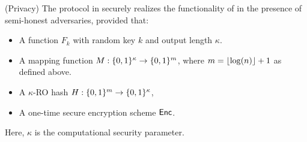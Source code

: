 \begin{theorem}(Privacy)
\label{thm:sotpriv}
The \SSOT protocol in  securely realizes the  functionality of  in the presence of semi-honest adversaries, provided that:
\begin{itemize}\addtolength{\itemsep}{-6pt}
	\item  A \batchOPRF function $F_k$ with random key $k$ and output length $\kappa$.
	\item A mapping function $M:\{0,1\}^\kappa \rightarrow \{0,1\}^m$, where $m={\lfloor{\log(n)}\rfloor}+1$ as defined above.
	\item A $\kappa$-RO hash  $H:\{0,1\}^m \rightarrow \{0,1\}^\kappa$, 
	\item A one-time secure encryption scheme $\mathsf{Enc}$.
\end{itemize}
Here,  $\kappa$ is the computational security parameter.
\end{theorem}

